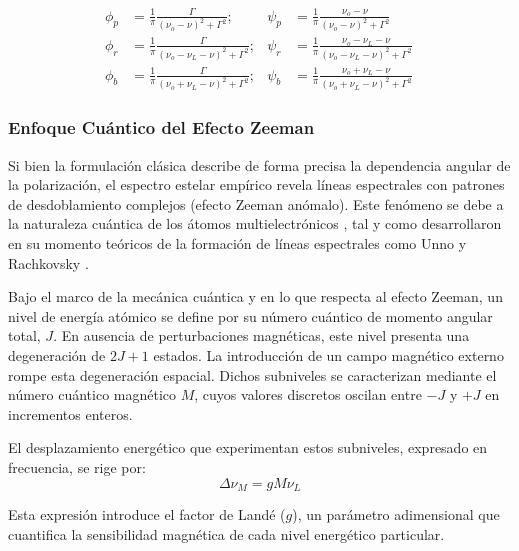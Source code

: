 \begin{equation}
    \label{eq:solPsi}
\begin{aligned}
\phi_p &= \frac{1}{\pi} \frac{\Gamma}{(\nu_o - \nu)^2 + \Gamma^2}; &
\psi_p &= \frac{1}{\pi} \frac{\nu_o - \nu}{(\nu_o - \nu)^2 + \Gamma^2} \\[6pt]
\phi_r &= \frac{1}{\pi} \frac{\Gamma}{(\nu_o - \nu_L - \nu)^2 + \Gamma^2}; &
\psi_r &= \frac{1}{\pi} \frac{\nu_o - \nu_L - \nu}{(\nu_o - \nu_L - \nu)^2 + \Gamma^2} \\[6pt]
\phi_b &= \frac{1}{\pi} \frac{\Gamma}{(\nu_o + \nu_L - \nu)^2 + \Gamma^2}; &
\psi_b &= \frac{1}{\pi} \frac{\nu_o + \nu_L - \nu}{(\nu_o + \nu_L - \nu)^2 + \Gamma^2} \, 
\end{aligned}
\end{equation}

\subsubsection{Enfoque Cuántico del Efecto Zeeman}
Si bien la formulación clásica describe de forma precisa la dependencia angular de la polarización, el espectro estelar empírico revela líneas espectrales con patrones de desdoblamiento complejos (efecto Zeeman anómalo). Este fenómeno se debe a la naturaleza cuántica de los átomos multielectrónicos \cite[pag. 104]{sanchezSolarObservationsTechniques1992}, tal y como desarrollaron en su momento teóricos de la formación de líneas espectrales como Unno \cite{Unno1956} y Rachkovsky \cite{Rachkovsky1962}.

Bajo el marco de la mecánica cuántica y en lo que respecta al efecto Zeeman, un nivel de energía atómico se define por su número cuántico de momento angular total, $J$. En ausencia de perturbaciones magnéticas, este nivel presenta una degeneración de $2J+1$ estados. La introducción de un campo magnético externo rompe esta degeneración espacial. Dichos subniveles se caracterizan mediante el número cuántico magnético $M$, cuyos valores discretos oscilan entre $-J$ y $+J$ en incrementos enteros.

El desplazamiento energético que experimentan estos subniveles, expresado en frecuencia, se rige por:
\begin{equation}
    \label{eq:desplazamientoZeemanCuantico}
    \Delta \nu_M = g M \nu_L
\end{equation}

Esta expresión introduce el factor de Landé ($g$), un parámetro adimensional que cuantifica la sensibilidad magnética de cada nivel energético particular.

